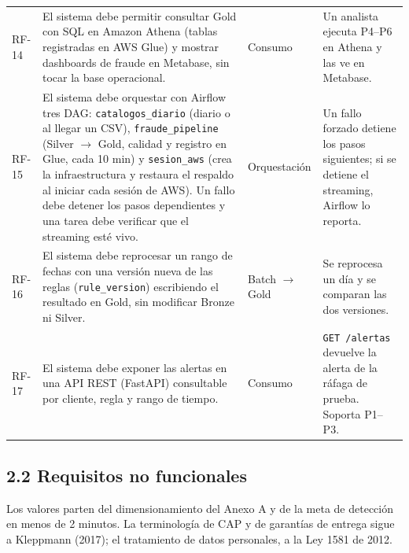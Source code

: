 \documentclass[12pt,letterpaper]{article}
\newcommand{\code}[1]{{\small\texttt{#1}}}
\begin{document}
\begin{footnotesize}
\begin{longtable}{@{}P{0.45in}P{2.85in}P{0.95in}P{2.05in}@{}}
RF-14 & El sistema debe permitir consultar Gold con SQL en Amazon Athena (tablas registradas en AWS Glue) y mostrar dashboards de fraude en Metabase, sin tocar la base operacional. & Consumo & Un analista ejecuta P4--P6 en Athena y las ve en Metabase.\\[1pt]
RF-15 & El sistema debe orquestar con Airflow tres DAG: \code{catalogos\_diario} (diario o al llegar un CSV), \code{fraude\_pipeline} (Silver $\rightarrow$ Gold, calidad y registro en Glue, cada 10 min) y \code{sesion\_aws} (crea la infraestructura y restaura el respaldo al iniciar cada sesión de AWS). Un fallo debe detener los pasos dependientes y una tarea debe verificar que el streaming esté vivo. & Orquestación & Un fallo forzado detiene los pasos siguientes; si se detiene el streaming, Airflow lo reporta.\\[1pt]
RF-16 & El sistema debe reprocesar un rango de fechas con una versión nueva de las reglas (\code{rule\_version}) escribiendo el resultado en Gold, sin modificar Bronze ni Silver. & Batch $\rightarrow$ Gold & Se reprocesa un día y se comparan las dos versiones.\\[1pt]
RF-17 & El sistema debe exponer las alertas en una API REST (FastAPI) consultable por cliente, regla y rango de tiempo. & Consumo & \code{GET /alertas} devuelve la alerta de la ráfaga de prueba. Soporta P1--P3.\\
\end{longtable}
\end{footnotesize}

\subsection*{2.2 Requisitos no funcionales}

Los valores parten del dimensionamiento del Anexo A y de la meta de detección en menos de 2 minutos. La terminología de CAP y de garantías de entrega sigue a Kleppmann (2017); el tratamiento de datos personales, a la Ley 1581 de 2012.
\end{document}
